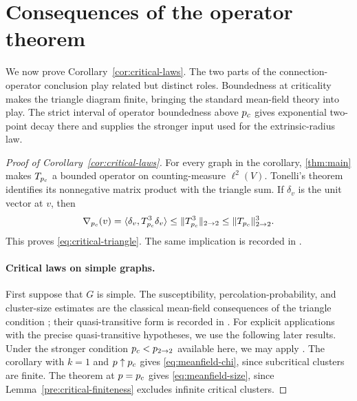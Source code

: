\section{Consequences of the operator theorem}
\label{cons:section}

We now prove Corollary~\ref{cor:critical-laws}. The two parts of the
connection-operator conclusion play related but distinct roles.
Boundedness at criticality makes the triangle diagram finite, bringing
the standard mean-field theory into play.
The strict interval of operator boundedness above ${p_c}$ gives
exponential two-point decay there and supplies the stronger input
used for the extrinsic-radius law.

\begin{proof}[Proof of Corollary~\ref{cor:critical-laws}]
For every graph in the corollary, \cref{thm:main} makes
$T_{{p_c}}$ a bounded operator on counting-measure $\ell^2(V)$.
Tonelli's theorem identifies its nonnegative matrix product with the
triangle sum. If $\delta_v$ is the unit vector at $v$, then
\[
 \nabla_{{p_c}}(v)
 =\langle\delta_v,T_{{p_c}}^{3}\delta_v\rangle
 \le\lVert T_{{p_c}}^{3}\rVert_{2\to2}
 \le\lVert T_{{p_c}}\rVert_{2\to2}^{3}.
\]
This proves \eqref{eq:critical-triangle}. The same implication is
recorded in \cite[Section~1]{Hutchcroft2020L2}.

\paragraph{Critical laws on simple graphs.}
First suppose that $G$ is simple. The susceptibility,
percolation-probability, and cluster-size estimates are the classical
mean-field consequences of the triangle condition
\cite{AizenmanNewman1984,BarskyAizenman1991}; their quasi-transitive
form is recorded in
\cite[Section~1, Equations~(1.1)--(1.3)]{Hutchcroft2020L2}.
For explicit applications with the precise quasi-transitive hypotheses,
we use the following later results. Under the stronger condition
${p_c}<{p_{2\to2}}$ available here, we may apply
\cite[Theorem~1.1 and Corollary~1.4]{Hutchcroft2022FiniteClusters}.
The corollary with $k=1$ and $p\uparrow{p_c}$ gives
\eqref{eq:meanfield-chi}, since subcritical clusters are finite.
The theorem at $p={p_c}$ gives \eqref{eq:meanfield-size}, since
Lemma~\ref{pre:critical-finiteness} excludes infinite critical clusters.


\end{proof}
